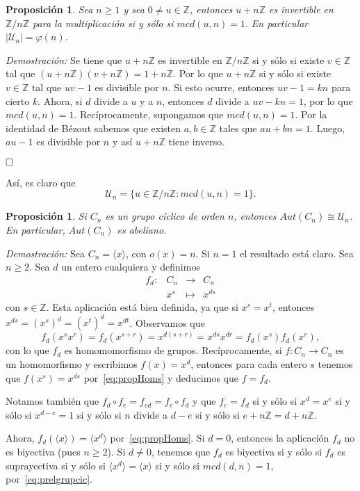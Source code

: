 \documentclass[12pt]{article}
\newtheorem{proposition}[theorem]{Proposición}
\begin{document}
\begin{proposition}Sea $n \geq 1$ y sea $0 \neq u \in \mathbb{Z}$, entonces $u + n\mathbb{Z}$ es invertible en $\mathbb{Z}/n\mathbb{Z}$ para la multiplicación si y sólo si $mcd(u,n)=1.$ En particular $|\mathcal{U}_n| = \varphi(n)$.
\end{proposition}
\emph{Demostración: }Se tiene que $u + n\mathbb{Z}$ es invertible en $\mathbb{Z}/n\mathbb{Z}$ si y sólo si existe $v \in \mathbb{Z}$ tal que $(u +n\mathbb{Z})(v+n\mathbb{Z})=1+n\mathbb{Z}$. Por lo que $u +n\mathbb{Z}$ si y sólo si existe $v \in \mathbb{Z}$ tal que $uv-1$ es divisible por $n$. Si esto ocurre, entonces $uv-1 = kn$ para cierto $k$. Ahora, si $d$ divide a $u$ y a $n$, entonces $d$ divide a $uv-kn = 1$, por lo que $mcd(u,n)=1$. Recíprocamente, supongamos que $mcd(u,n)=1$. Por la identidad de Bézout sabemos que existen $a,b \in \mathbb{Z}$ tales que $au+bn = 1$. Luego, $au-1$ es divisible por $n$ y así $u+n\mathbb{Z}$ tiene inverso.

$\hfill \square$

Así, es claro que $$\mathcal{U}_n = \lbrace u \in \mathbb{Z}/n\mathbb{Z}:mcd(u,n)=1 \rbrace.$$

\begin{proposition}Si $C_n$ es un grupo cíclico de orden $n$, entonces $Aut(C_n) \cong \mathcal{U}_n$. En particular, $Aut(C_n)$ es abeliano.
\end{proposition}
\emph{Demostración: }Sea $C_n = \langle x \rangle$, con $o(x)=n$. Si $n = 1$ el resultado está claro. Sea $n \geq 2$. Sea $d$ un entero cualquiera y definimos $$\begin{array}{rccl}
f_d \colon &C_n&\longrightarrow &C_n \\
&x^s& \longmapsto &x^{ds}
\end{array}
$$
con $s \in \mathbb{Z}$. Esta aplicación está bien definida, ya que si $x^s = x^t$, entonces $x^{ds}= (x^s)^d=(x^t)^d= x^{dt}$. Observamos que $$f_d(x^sx^r)=f_d(x^{s+r})=x^{d(s+r)} = x^{ds}x^{dr} = f_d(x^s)f_d(x^r),$$ con lo que $f_d$ es homomomorfismo de grupos. Recíprocamente, si $f \colon C_n \longrightarrow C_n$ es un homomorfismo y escribimos $f(x)=x^d$, entonces para cada entero $s$ tenemos que $f(x^s) = x^{ds}$ por~\ref{eq:propHoms} y deducimos que $f=f_d$.

Notamos también que $f_d \circ f_e = f_{ed} = f_e \circ f_d$ y que $f_e = f_d$ si y sólo si $x^d = x^e$ si y sólo si $x^{d-e}=1$ si y sólo si $n$ divide a $d-e$ si y sólo si $e+n\mathbb{Z} = d+n\mathbb{Z}.$

Ahora, $f_d( \langle x \rangle ) = \langle x^d \rangle$ por~\ref{eq:propHoms}. Si $d = 0$, entonces la aplicación $f_d$ no es biyectiva (pues $n\geq 2$). Si $d \neq 0$, tenemos que $f_d$ es biyectiva si y sólo si $f_d$ es suprayectiva si y sólo si $\langle x^d \rangle = \langle x \rangle$ si y sólo si $mcd(d,n)=1$, por~\ref{eq:prelgrupcic}.
\end{document}
